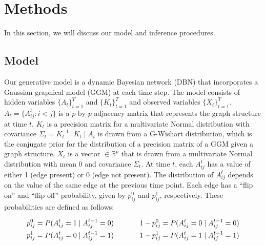 \documentclass{article}
\begin{document}
\section{Methods}
\label{sec:methods}

In this section, we will discuss our model and inference procedures.

\subsection{Model}
\label{sec:model}
Our generative model is a dynamic Bayesian network (DBN) that incorporates a Gaussian graphical model (GGM) at each time step. The model consists of hidden variables $\{A_t\}_{t=1}^T$ and $\{K_t\}_{t=1}^T$ and observed variables $\{X_t\}_{t=1}^T$. $A_t = \{ A_{ij}^t : i < j \}$ is a $p\text{-by-}p$ adjacency matrix that represents the graph structure at time $t$. $K_t$ is a precision matrix for a multivariate Normal distribution with covariance $\Sigma_t = K_t^{-1}$. $K_t \mid A_t$ is drawn from a G-Wishart distribution, which is the conjugate prior for the distribution of a precision matrix of a GGM given a graph structure. $X_t$ is a vector $\in \mathbb{R}^p$ that is drawn from a multivariate Normal distribution with mean $0$ and covariance $\Sigma_t$. At time $t$, each $A_{ij}^t$ has a value of either 1 (edge present) or 0 (edge not present). The distribution of $A_{ij}^t$ depends on the value of the same edge at the previous time point. Each edge has a ``flip on'' and ``flip off'' probability, given by $p_{ij}^0$ and $p_{ij}^1$, respectively. These probabilities are defined as follows: 

\begin{align*}
p_{ij}^0 = P(A_{ij}^t = 1 \mid A_{ij}^{t-1} = 0) \hspace{.5in} 1 - p_{ij}^0 = P(A_{ij}^t = 0 \mid A_{ij}^{t-1} = 0) \\
p_{ij}^1 = P(A_{ij}^t = 0 \mid A_{ij}^{t-1} = 1) \hspace{.5in} 1 - p_{ij}^1 = P(A_{ij}^t = 1 \mid A_{ij}^{t-1} = 1)
\end{align*}
\end{document}
